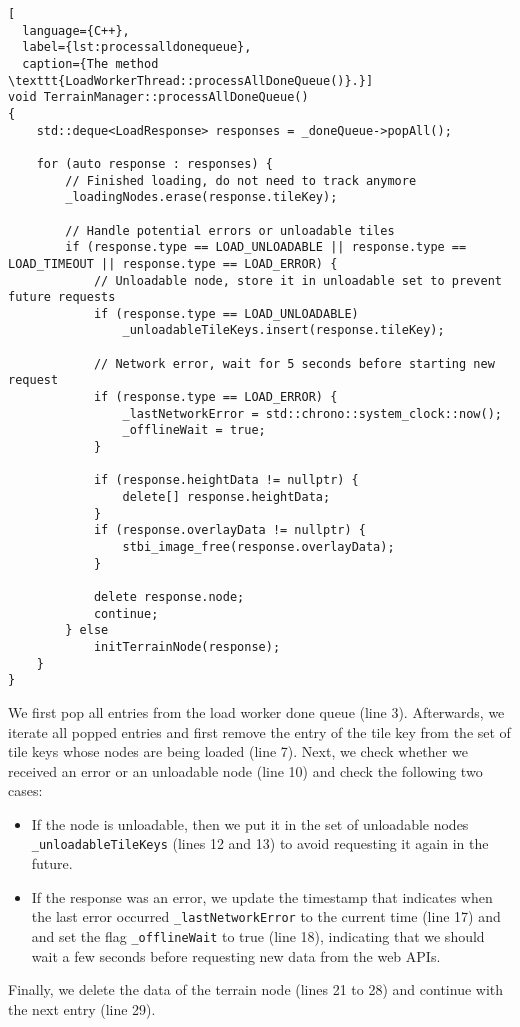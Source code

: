 \begin{lstlisting}[
  language={C++},
  label={lst:processalldonequeue},
  caption={The method \texttt{LoadWorkerThread::processAllDoneQueue()}.}]
void TerrainManager::processAllDoneQueue()
{
    std::deque<LoadResponse> responses = _doneQueue->popAll();

    for (auto response : responses) {
        // Finished loading, do not need to track anymore
        _loadingNodes.erase(response.tileKey);

        // Handle potential errors or unloadable tiles
        if (response.type == LOAD_UNLOADABLE || response.type == LOAD_TIMEOUT || response.type == LOAD_ERROR) {
            // Unloadable node, store it in unloadable set to prevent future requests
            if (response.type == LOAD_UNLOADABLE)
                _unloadableTileKeys.insert(response.tileKey);

            // Network error, wait for 5 seconds before starting new request
            if (response.type == LOAD_ERROR) {
                _lastNetworkError = std::chrono::system_clock::now();
                _offlineWait = true;
            }

            if (response.heightData != nullptr) {
                delete[] response.heightData;
            }
            if (response.overlayData != nullptr) {
                stbi_image_free(response.overlayData);
            }

            delete response.node;
            continue;
        } else
            initTerrainNode(response);
    }
}
\end{lstlisting}
We first pop all entries from the load worker done queue 
(line 3). Afterwards, we iterate all popped entries  
and first remove the entry of the tile key from 
the set of tile keys whose nodes are being loaded (line 7).
Next, we check whether we received an error or an unloadable 
node (line 10) and check the following two cases:
\begin{itemize}
  \item If the node is unloadable, then we put it in the set of 
        unloadable nodes \texttt{\_unloadableTileKeys} (lines 12 and 13)
        to avoid requesting it again in the future.
  \item If the response was an error, we update the 
        timestamp that indicates when the last error occurred \texttt{\_lastNetworkError}
        to the current time (line 17) and and set the 
        flag \texttt{\_offlineWait} to true (line 18),
        indicating that we should wait a few seconds before 
        requesting new data from the web APIs.
\end{itemize}
Finally, we delete the data of the terrain node (lines 21 to 28)
and continue with the next entry (line 29).

